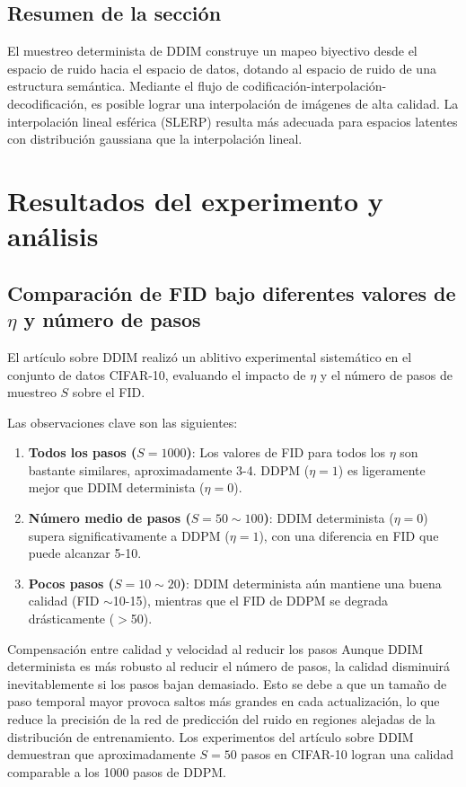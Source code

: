 \documentclass[a4paper]{article}
\begin{document}
\subsection{Resumen de la sección}

El muestreo determinista de DDIM construye un mapeo biyectivo desde el espacio de ruido hacia el espacio de datos, dotando al espacio de ruido de una estructura semántica. Mediante el flujo de codificación-interpolación-decodificación, es posible lograr una interpolación de imágenes de alta calidad. La interpolación lineal esférica (SLERP) resulta más adecuada para espacios latentes con distribución gaussiana que la interpolación lineal.
\section{Resultados del experimento y análisis}

\subsection{Comparación de FID bajo diferentes valores de $\eta$ y número de pasos}

El artículo sobre DDIM realizó un ablitivo experimental sistemático en el conjunto de datos CIFAR-10, evaluando el impacto de $\eta$ y el número de pasos de muestreo $S$ sobre el FID.

Las observaciones clave son las siguientes:

\begin{enumerate}
    \item \textbf{Todos los pasos ($S=1000$)}: Los valores de FID para todos los $\eta$ son bastante similares, aproximadamente 3-4. DDPM ($\eta=1$) es ligeramente mejor que DDIM determinista ($\eta=0$).
    \item \textbf{Número medio de pasos ($S=50\sim100$)}: DDIM determinista ($\eta=0$) supera significativamente a DDPM ($\eta=1$), con una diferencia en FID que puede alcanzar 5-10.
    \item \textbf{Pocos pasos ($S=10\sim20$)}: DDIM determinista aún mantiene una buena calidad (FID $\sim$10-15), mientras que el FID de DDPM se degrada drásticamente ($>$50).
\end{enumerate}

\begin{warningbox}{Compensación entre calidad y velocidad al reducir los pasos}
Aunque DDIM determinista es más robusto al reducir el número de pasos, la calidad disminuirá inevitablemente si los pasos bajan demasiado. Esto se debe a que un tamaño de paso temporal mayor provoca saltos más grandes en cada actualización, lo que reduce la precisión de la red de predicción del ruido en regiones alejadas de la distribución de entrenamiento. Los experimentos del artículo sobre DDIM demuestran que aproximadamente $S=50$ pasos en CIFAR-10 logran una calidad comparable a los 1000 pasos de DDPM.
\end{warningbox}
\end{document}
